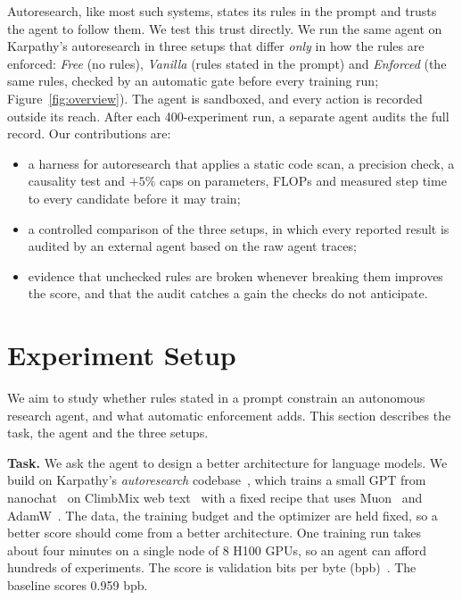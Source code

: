 \documentclass{article}
\newcommand{\bpb}{bpb}
\begin{document}
Autoresearch, like most such systems, states its rules in the prompt and trusts the agent to follow them. We test this trust directly. We run the same agent on Karpathy's autoresearch in three setups that differ \emph{only}
in how the rules are enforced: \emph{Free} (no rules), \emph{Vanilla} (rules
stated in the prompt) and \emph{Enforced} (the same rules, checked by an automatic gate
before every training run; Figure~\ref{fig:overview}). The agent is sandboxed, and every action is recorded outside its reach. After each
400-experiment run, a separate agent audits the full record. Our contributions are:
\begin{itemize}
\item a harness for autoresearch that applies a static code scan, a precision check, a causality
test and $+5\%$ caps on parameters, FLOPs and measured step time to every candidate before it may train;
\item a controlled comparison of the three setups,
in which every reported result is audited by an external agent based on the raw agent traces;
\item evidence that unchecked rules are broken whenever breaking them improves the score, and that the audit catches a gain the checks do not anticipate.
\end{itemize}

\section{Experiment Setup}
\label{sec:setup}

We aim to study whether rules stated in a prompt constrain an autonomous research agent, and what automatic
enforcement adds. This section describes the task, the agent and the three setups.

\textbf{Task.} We ask the agent to design a better architecture for language models. We build on
Karpathy's \emph{autoresearch} codebase~\citep{karpathy2026autoresearch}, which trains a small GPT from
nanochat~\citep{karpathy2025nanochat} on ClimbMix web text~\citep{diao2025climb} with a fixed recipe that uses
Muon~\citep{jordan2024muon} and AdamW~\citep{loshchilov2019adamw}. The data, the training budget and the
optimizer are held fixed, so a better score should come from a better architecture. One training run takes about
four minutes on a single node of 8 H100 GPUs, so an agent can afford hundreds of experiments. The score is
validation bits per byte (\bpb{})~\citep{gao2020pile}. The baseline scores 0.959 \bpb{}.
\end{document}
